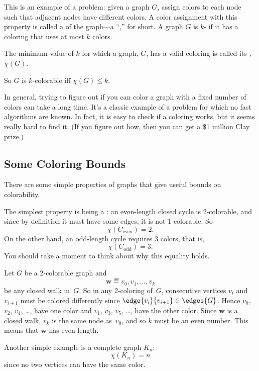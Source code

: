 This is an example of a  problem:
 given a graph $G$, assign colors to each
node such that adjacent nodes have different colors.  A color assignment
with this property is called a   of the graph---a ``,'' for short.  A graph $G$
is $k$- if it has a coloring that uses at most $k$ colors.
\begin{definition}
  The minimum value of $k$ for which a graph, $G$, has a valid coloring is
  called its , $\chi(G)$.
\end{definition}
\begin{editingnotes}
\end{editingnotes}
So $G$ is $k$-colorable iff $\chi(G) \leq k$.

In general, trying to figure out if you can color a graph with a fixed
number of colors can take a long time.  It's a classic example of a
problem for which no fast algorithms are known.  In fact, it is easy to
check if a coloring works, but it seems really hard to find it. (If you
figure out how, then you can get a \$1 million Clay prize.)


\subsection{Some Coloring Bounds}

There are some simple properties of graphs that give useful bounds on
colorability. 
\begin{editingnotes}
\end{editingnotes}
The simplest property is being a : an even-length closed cycle
is 2-colorable, and since by definition it must have some edges, it is not
1-colorable.  So
\[
\chi(C_{\text{even}}) = 2.
\]
On the other hand, an odd-length cycle requires 3 colors, that is,
\begin{equation}\label{Codd3}
\chi(C_{\text{odd}}) = 3.
\end{equation}
You should take a moment to think about why this equality holds.
\begin{editingnotes}

Let $G$ be a 2-colorable graph and
\begin{equation*}
    \mathbf{w} \eqdef v_0, v_1, \dots, v_k
\end{equation*}
be any closed walk in~$G$.  So in any 2-coloring of~$G$, consecutive
vertices $v_i$ and $v_{i + 1}$ must be colored differently since
$\edge{v_i}{v_{i + 1}} \in \edges{G}$.  
Hence $v_0$, $v_2$, $v_4$, \dots, have one color and $v_1$, $v_3$,
$v_5$, \dots, have the other color.  Since $\mathbf{w}$ is a closed
walk, $v_k$ is the same node as~$v_0$, and so $k$ must be an even
number.  This means that $\mathbf{w}$ has even length.
\end{editingnotes}
Another simple example is a complete graph $K_n$:
\[
\chi(K_n) = n
\]
since no two vertices can have the same color.

